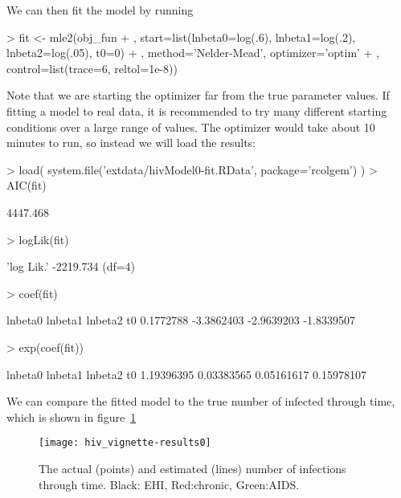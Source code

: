 \documentclass{article}
\begin{document}
We can then fit the model by running
\begin{Schunk}
\begin{Sinput}
> fit <- mle2(obj_fun
+   , start=list(lnbeta0=log(.6), lnbeta1=log(.2), lnbeta2=log(.05), t0=0)
+   , method='Nelder-Mead', optimizer='optim' 
+   ,  control=list(trace=6, reltol=1e-8))
\end{Sinput}
\end{Schunk}
Note that we are starting the optimizer far from the true parameter values.
If fitting a model to real data, it is recommended to try many different starting conditions over a large range of values.  
The optimizer would take about 10 minutes to run, so instead we will load the results:
\begin{Schunk}
\begin{Sinput}
> load( system.file('extdata/hivModel0-fit.RData', package='rcolgem') )
> AIC(fit)
\end{Sinput}
\begin{Soutput}
[1] 4447.468
\end{Soutput}
\begin{Sinput}
> logLik(fit)
\end{Sinput}
\begin{Soutput}
'log Lik.' -2219.734 (df=4)
\end{Soutput}
\begin{Sinput}
> coef(fit)
\end{Sinput}
\begin{Soutput}
   lnbeta0    lnbeta1    lnbeta2         t0 
 0.1772788 -3.3862403 -2.9639203 -1.8339507 
\end{Soutput}
\begin{Sinput}
> exp(coef(fit))
\end{Sinput}
\begin{Soutput}
   lnbeta0    lnbeta1    lnbeta2         t0 
1.19396395 0.03383565 0.05161617 0.15978107 
\end{Soutput}
\end{Schunk}


We can compare the fitted model to the true number of infected through time, which is shown in figure~\ref{fig:results0}
\begin{figure}
	\begin{center}
\texttt{[image: hiv\_vignette-results0]}
	\end{center}
	\caption{The actual (points) and estimated (lines) number of infections through time. Black: EHI, Red:chronic, Green:AIDS. 
		\label{fig:results0}}
\end{figure}
\end{document}

